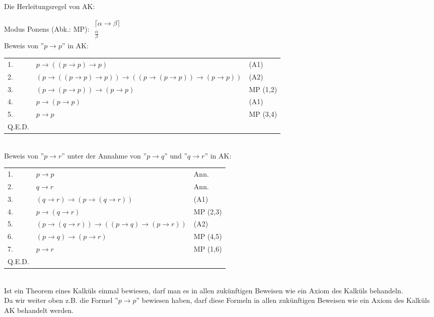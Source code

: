 \documentclass{scrartcl}
\begin{document}
Die Herleitungsregel von AK:

Modus Ponens (Abk.: MP): $ \substack{\lceil \alpha \rightarrow \beta \rceil \\ \frac{\alpha}{\beta}} $ \\

Beweis von ''$ p \rightarrow p $'' in AK:

\begin{tabularx}{\linewidth}{l l l}
	1. & $ p \rightarrow ((p \rightarrow p) \rightarrow p) $ & (A1) \\
	2. & $ (p \rightarrow ((p \rightarrow p) \rightarrow p)) \rightarrow ((p \rightarrow (p \rightarrow p)) \rightarrow (p \rightarrow p)) $ & (A2) \\
	3. & $ (p \rightarrow (p \rightarrow p)) \rightarrow (p \rightarrow p) $ & MP (1,2) \\
	4. & $ p \rightarrow (p \rightarrow p) $ & (A1) \\
	5. & $ p \rightarrow p $ & MP (3,4) \\
	Q.E.D. & & 
\end{tabularx} \\

Beweis von ''$ p \rightarrow r $'' unter der Annahme von ''$ p \rightarrow q $'' und ''$ q \rightarrow r $'' in AK:

\begin{tabularx}{\linewidth}{l l l}
	1. & $ p \rightarrow p $ & Ann. \\
	2. & $ q \rightarrow r $ & Ann. \\
	3. & $ (q \rightarrow r) \rightarrow (p \rightarrow (q \rightarrow r)) $ & (A1) \\
	4. & $ p \rightarrow (q \rightarrow r) $ & MP (2,3) \\
	5. & $ (p \rightarrow (q \rightarrow r)) \rightarrow ((p \rightarrow q) \rightarrow (p \rightarrow r)) $ & (A2) \\
	6. & $ (p \rightarrow q) \rightarrow (p \rightarrow r) $ & MP (4,5) \\
	7. & $ p \rightarrow r $ & MP (1,6) \\
	Q.E.D. & & 
\end{tabularx} \\

Ist ein Theorem eines Kalküls einmal bewiesen, darf man es in allen zukünftigen Beweisen wie ein Axiom des Kalküls behandeln. \\

Da wir weiter oben z.B. die Formel ''$ p \rightarrow p $'' bewiesen haben, darf diese Formeln in allen zukünftigen Beweisen wie ein Axiom des Kalküls AK behandelt werden. \\
\end{document}
